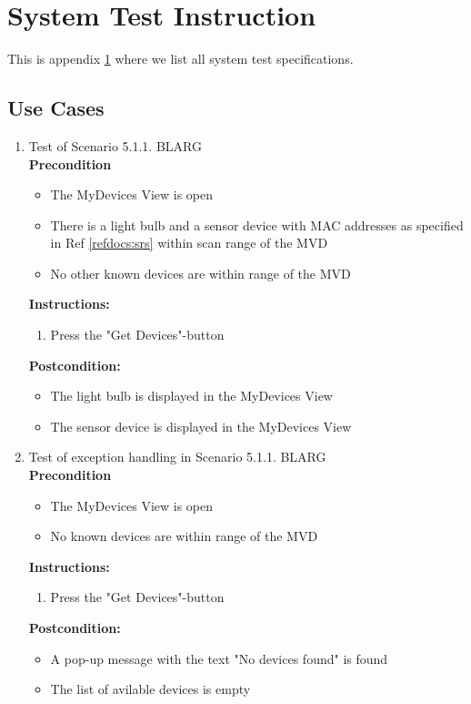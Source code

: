 \documentclass[a4paper]{article}
\newlength{\testlabellength}
\newenvironment{testlist}{\begin{enumerate}[label=\bfseries Instruction \thesubsection.\arabic* , labelindent=0pt, labelwidth=\testlabellength , leftmargin=2cm]}{\end{enumerate}}
\newenvironment{precondition}{
{\color{white}BLARG}\\ 
\textbf{Precondition}
\begin{itemize}[labelindent=0cm, labelwidth=2cm , leftmargin=1cm]
}
{\end{itemize}}
\newenvironment{instruction}{
\textbf{Instructions:}
\begin{enumerate}[label=\bfseries  \arabic*., labelindent=0cm, labelwidth=2cm , leftmargin=1cm]
}
{\end{enumerate}}
\newenvironment{postcondition}{
\textbf{Postcondition:}
\begin{itemize}[labelindent=0cm, labelwidth=2cm , leftmargin=1cm]
}
{\end{itemize}}
\begin{document}
\begin{appendices}
\begin{testlist}
\end{testlist}	

\newpage

\section{System Test Instruction} \label{appendix:section:systemtest}
This is appendix \ref{appendix:section:systemtest} where we list all system test specifications.

\subsection{Use Cases}
\begin{testlist}
	\item Test of Scenario 5.1.1.
		\begin{precondition}
			\item The MyDevices View is open
			\item There is a light bulb and a sensor device with MAC addresses as specified in Ref \ref{refdocs:srs} within scan range of the MVD
			\item No other known devices are within range of the MVD
		\end{precondition}
		\begin{instruction}
			\item Press the "Get Devices"-button
		\end{instruction}
		\begin{postcondition}
			\item The light bulb is displayed in the MyDevices View
		 	\item The sensor device is displayed in the MyDevices View
		\end{postcondition}

	\item Test of exception handling in Scenario 5.1.1.
		\begin{precondition}
			\item The MyDevices View is open
			\item No known devices are within range of the MVD
		\end{precondition}
		\begin{instruction}
			\item Press the "Get Devices"-button
		\end{instruction}
		\begin{postcondition}
			\item A pop-up message with the text "No devices found" is found
			\item The list of avilable devices is empty
		\end{postcondition}
	

\end{testlist}
\end{appendices}
\end{document}
